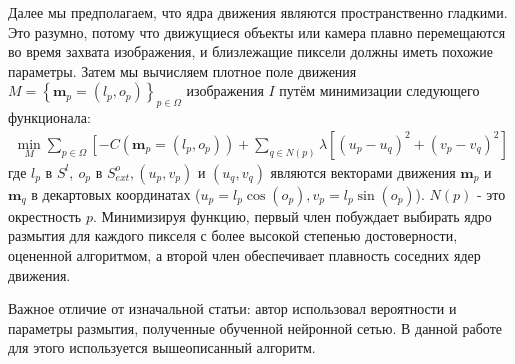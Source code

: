 Далее мы предполагаем, что ядра движения являются пространственно
гладкими. Это разумно, потому что движущиеся объекты или камера плавно перемещаются во время захвата изображения, и близлежащие пиксели должны иметь похожие параметры. Затем мы вычисляем плотное поле движения $M=\left\{\mathbf{m}_{p}=\left(l_{p}, o_{p}\right)\right\}_{p \in \Omega}$ изображения $I$ путём минимизации следующего функционала:
$$
\begin{gathered}
\min _{M} \sum_{p \in \Omega}\left[-C\left(\mathbf{m}_{p}=\left(l_{p}, o_{p}\right)\right)+\right. 
\sum_{q \in N(p)} \lambda\left[\left(u_{p}-u_{q}\right)^{2}+\left(v_{p}-v_{q}\right)^{2}\right]
\end{gathered}
$$
где $l_{p}$ в  $S^{l},\ o_{p}$ в $S_{e x t}^{o},\left(u_{p}, v_{p}\right)$ и $\left(u_{q}, v_{q}\right)$ являются векторами движения $\mathbf{m}_{p}$ и $\mathbf{m}_{q}$ в декартовых координатах ($u_{p}=l_{p} \cos \left(o_{p}\right), v_{p}=l_{p} \sin \left(o_{p}\right)$). $N(p)$ - это окрестность $p$. Минимизируя функцию, первый член побуждает выбирать ядро размытия для каждого пикселя с более высокой степенью достоверности, оцененной алгоритмом, а второй член обеспечивает плавность соседних ядер движения.

Важное отличие от изначальной статьи: автор использовал вероятности и параметры размытия, полученные обученной нейронной сетью. В данной работе для этого используется вышеописанный алгоритм.

